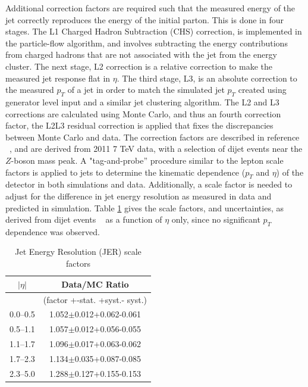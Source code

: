 \par Additional correction factors are required such that the measured
energy of the jet correctly reproduces the energy of the initial
parton.  This is done in four stages.  The L1 Charged Hadron
Subtraction (CHS) correction, is implemented in the particle-flow
algorithm, and involves subtracting the energy contributions from
charged hadrons that are not associated with the jet from the energy
cluster.  The next stage, L2 correction is a relative correction to
make the measured jet response flat in $\eta$.  The third stage, L3,
is an absolute correction to the measured $p_T$ of a jet in order to
match the simulated jet $p_{T}$ created using generator level input
and a similar jet clustering algorithm. The L2 and L3 corrections are
calculated using Monte Carlo, and thus an fourth correction factor,
the L2L3 residual correction is applied that fixes the discrepancies
between Monte Carlo and data.  The correction factors are described in
reference ~\cite{CMS:2011esa}, and are derived from 2011 7 TeV data,
with a selection of dijet events near the $Z$-boson mass peak.  A
"tag-and-probe'' procedure similar to the lepton scale factors is
applied to jets to determine the kinematic dependence ($p_{T}$ and
$\eta$) of the detector in both simulations and data.  Additionally, a
scale factor is needed to adjust for the difference in jet energy
resolution as measured in data and predicted in simulation.  Table
\ref{tab:JERtable} gives the scale factors, and uncertainties, as
derived from dijet events ~\cite{CMS:2011esa} as a function of $\eta$
only, since no significant $p_{T}$ dependence was observed.  

\begin{table}
\centering
\begin{tabular}{|c|c|}
\hline\hline
$|\eta|$ & Data/MC Ratio \\ \hline
 & (factor +-stat. +syst.- syst.) \\ \hline
0.0–0.5 & 1.052$\pm$0.012+0.062-0.061 \\
0.5–1.1 & 1.057$\pm$0.012+0.056-0.055 \\
1.1–1.7 & 1.096$\pm$0.017+0.063-0.062 \\
1.7–2.3 & 1.134$\pm$0.035+0.087-0.085 \\
2.3–5.0 & 1.288$\pm$0.127+0.155-0.153 \\
\hline\hline
\end{tabular}
\caption{Jet Energy Resolution (JER) scale factors}
\label{tab:JERtable}
\end{table} 

